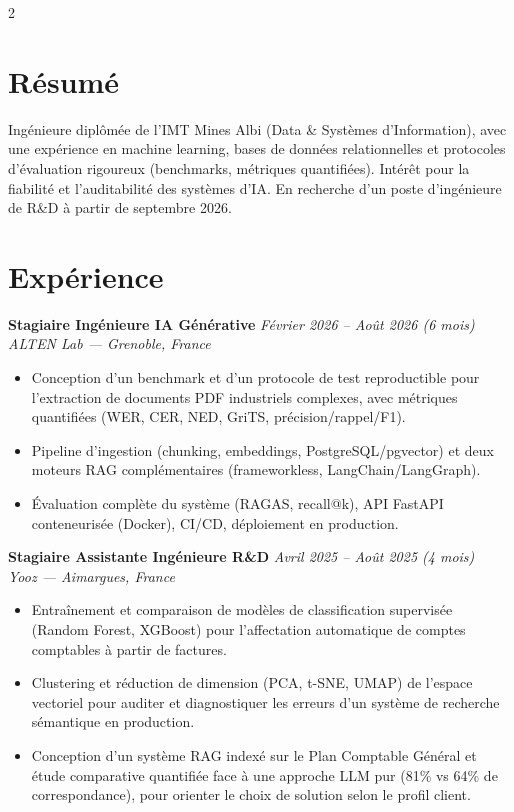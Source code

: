 \documentclass[10.5pt,a4paper]{article}
\newcommand{\sectionrule}{\vspace{-6pt}{\color{accent}\hrule height 1pt}\vspace{5pt}}
\newcommand{\cvexp}[5]{%
  \noindent\textbf{#1} \hfill {\itshape\color{graytext}\small #4}\\
  {\itshape #2 --- #3}\\[-2pt]
  #5
  \vspace{7pt}
}
\begin{document}
\setlength{\columnsep}{1.5em}
\begin{paracol}{2}

\section*{Résumé}
\sectionrule
\justifying
Ingénieure diplômée de l'IMT Mines Albi (Data \& Systèmes d'Information), avec une expérience en machine learning, bases de données relationnelles et protocoles d'évaluation rigoureux (benchmarks, métriques quantifiées). Intérêt pour la fiabilité et l'auditabilité des systèmes d'IA. En recherche d'un poste d'ingénieure de R\&D à partir de septembre 2026.

\section*{Expérience}
\sectionrule

\cvexp{Stagiaire Ingénieure IA Générative}{ALTEN Lab}{Grenoble, France}{Février 2026 -- Août 2026 (6 mois)}{%
  \begin{itemize}[leftmargin=12pt, itemsep=2pt, topsep=0pt, partopsep=0pt, parsep=0pt]
    \item Conception d'un benchmark et d'un protocole de test reproductible pour l'extraction de documents PDF industriels complexes, avec métriques quantifiées (WER, CER, NED, GriTS, précision/\allowbreak rappel/\allowbreak F1).
    \item Pipeline d'ingestion (chunking, embeddings, PostgreSQL/\allowbreak pgvector) et deux moteurs RAG complémentaires (frameworkless, LangChain/\allowbreak LangGraph).
    \item Évaluation complète du système (RAGAS, recall@k), API FastAPI conteneurisée (Docker), CI/CD, déploiement en production.
  \end{itemize}
}

\cvexp{Stagiaire Assistante Ingénieure R\&D}{Yooz}{Aimargues, France}{Avril 2025 -- Août 2025 (4 mois)}{%
  \begin{itemize}[leftmargin=12pt, itemsep=2pt, topsep=0pt, partopsep=0pt, parsep=0pt]
    \item Entraînement et comparaison de modèles de classification supervisée (Random Forest, XGBoost) pour l'affectation automatique de comptes comptables à partir de factures.
    \item Clustering et réduction de dimension (PCA, t-SNE, UMAP) de l'espace vectoriel pour auditer et diagnostiquer les erreurs d'un système de recherche sémantique en production.
    \item Conception d'un système RAG indexé sur le Plan Comptable Général et étude comparative quantifiée face à une approche LLM pur (81\% vs 64\% de correspondance), pour orienter le choix de solution selon le profil client.
  \end{itemize}
}


\end{paracol}
\end{document}
